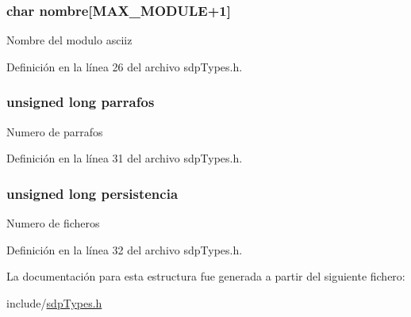 \subsubsection[{nombre}]{\setlength{\rightskip}{0pt plus 5cm}char nombre\mbox{[}{\bf M\+A\+X\+\_\+\+M\+O\+D\+U\+L\+E}+1\mbox{]}}\label{struct_s_t___s_d_p_a59b9df3193b6f874922b75715fc1bc81}
Nombre del modulo asciiz 

Definición en la línea 26 del archivo sdp\+Types.\+h.

\hypertarget{struct_s_t___s_d_p_a00d906c1e1a889fb8b6f26c73b188936}{}
\subsubsection[{parrafos}]{\setlength{\rightskip}{0pt plus 5cm}unsigned long parrafos}\label{struct_s_t___s_d_p_a00d906c1e1a889fb8b6f26c73b188936}
Numero de parrafos 

Definición en la línea 31 del archivo sdp\+Types.\+h.

\hypertarget{struct_s_t___s_d_p_a256f4cda4f61488d2d766c867e813014}{}
\subsubsection[{persistencia}]{\setlength{\rightskip}{0pt plus 5cm}unsigned long persistencia}\label{struct_s_t___s_d_p_a256f4cda4f61488d2d766c867e813014}
Numero de ficheros 

Definición en la línea 32 del archivo sdp\+Types.\+h.



La documentación para esta estructura fue generada a partir del siguiente fichero\+:\begin{DoxyCompactItemize}
\item 
include/\hyperlink{sdp_types_8h}{sdp\+Types.\+h}\end{DoxyCompactItemize}
